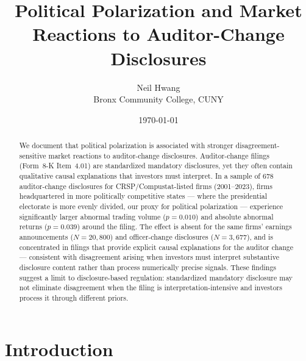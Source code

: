 \documentclass[12pt]{article}
\title{Political Polarization and Market Reactions to Auditor-Change Disclosures}
\author{Neil Hwang\\
        \small Bronx Community College, CUNY}
\date{\today}
\begin{document}
\maketitle
\doublespacing


\begin{abstract}
We document that political polarization is associated with stronger
disagreement-sensitive market reactions to auditor-change disclosures.
Auditor-change filings (Form~8-K Item~4.01) are standardized mandatory
disclosures, yet they often contain qualitative causal explanations that
investors must interpret. In a sample of 678 auditor-change disclosures
for CRSP/Compustat-listed firms (2001--2023), firms headquartered in more
politically competitive states --- where the presidential electorate is
more evenly divided, our proxy for political polarization --- experience
significantly larger abnormal trading volume ($p = 0.010$) and absolute
abnormal returns ($p = 0.039$) around the filing. The effect is absent
for the same firms' earnings announcements ($N = 20{,}800$) and
officer-change disclosures ($N = 3{,}677$), and is concentrated in
filings that provide explicit causal explanations for the auditor change
--- consistent with disagreement arising when investors must interpret
substantive disclosure content rather than process numerically precise
signals. These findings suggest a limit to disclosure-based regulation:
standardized mandatory disclosure may not eliminate disagreement when the
filing is interpretation-intensive and investors process it through
different priors.
\end{abstract}


\section{Introduction}
\label{sec:intro}
\end{document}
